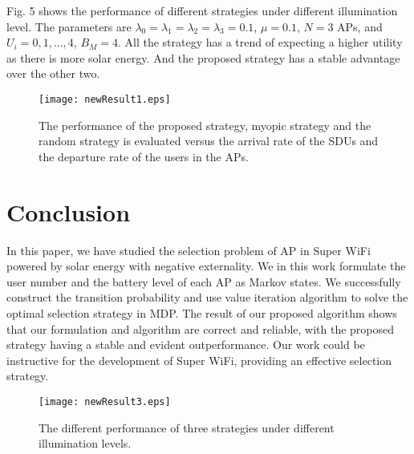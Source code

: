 \documentclass[conference]{IEEEtran}
\begin{document}
\indent Fig. 5 shows the performance of different strategies under different illumination level. The parameters are \(\lambda_0 = \lambda_1 = \lambda_2 = \lambda_3 = 0.1\), \(\mu = 0.1\), \(N = 3\) APs, and \(U_i = 0, 1,...,4\), \(B_M=4\). All the strategy has a trend of expecting a higher utility as there is more solar energy. And the proposed strategy has a stable advantage over the other two.\\
\begin{figure}
\centering
\texttt{[image: newResult1.eps]}\\
\caption{The performance of the proposed strategy, myopic strategy and the random strategy is evaluated versus the arrival rate of the SDUs and the departure rate of the users in the APs.}
\end{figure}
\section{Conclusion}
In this paper, we have studied the selection problem of AP in Super WiFi powered by solar energy with negative externality. We in this work formulate the user number and the battery level of each AP as Markov states. We successfully construct the transition probability and use value iteration algorithm to solve the optimal selection strategy in MDP. The result of our proposed algorithm shows that our formulation and algorithm are correct and reliable, with the proposed strategy having a stable and evident outperformance. Our work could be instructive for the development of Super WiFi, providing an effective selection strategy.
\begin{figure}
\centering
\texttt{[image: newResult3.eps]}\\
\caption{The different performance of three strategies under different illumination levels.}
\end{figure}


\end{document}
